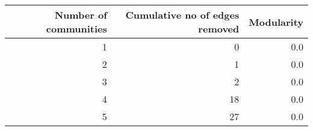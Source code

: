\begin{tabular}{rrr}
\toprule
 Number of communities &  Cumulative no of edges removed &  Modularity \\
\midrule
                     1 &                               0 &         0.0 \\
                     2 &                               1 &         0.0 \\
                     3 &                               2 &         0.0 \\
                     4 &                              18 &         0.0 \\
                     5 &                              27 &         0.0 \\
\bottomrule
\end{tabular}
